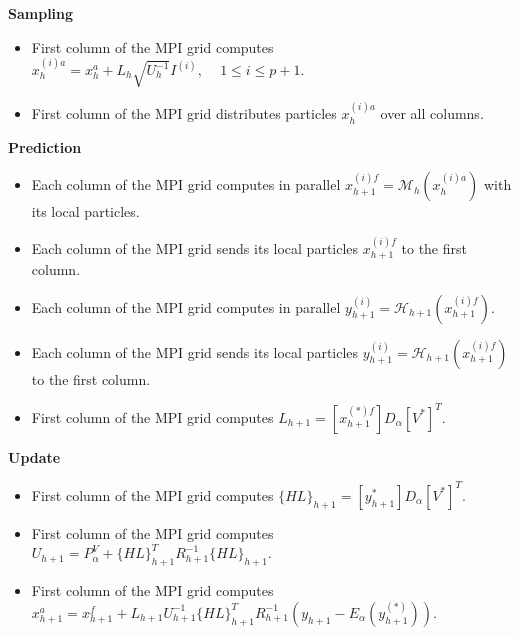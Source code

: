 \documentclass{tufte-book}
\begin{document}
 \par  \textbf{Sampling}


 \begin{itemize}

  \item First column  of the MPI grid computes  $ x_{h}^{(i)a} = x_h^a + L_h\sqrt{U_h^{-1}}I^{(i)} \textrm{, } \quad 1\leq i \leq p+1 $.

  \item First column  of the MPI grid distributes particles  $ x_{h}^{(i)a} $ over all columns.\\

 \end{itemize}

  \par  \textbf{Prediction}

   \begin{itemize}

  \item Each column  of the MPI grid computes in parallel  $ x_{h+1}^{(i)f} = \mathcal{M}_{h}(x_{h}^{(i)a})$ with its local particles.

  \item Each column of the MPI grid sends its local particles  $ x_{h+1}^{(i)f}$ to the first column.

   \item Each column of the MPI grid  computes in parallel  $ y_{h+1}^{(i)} = \mathcal{H}_{h+1}(x_{h+1}^{(i)f})$.

    \item Each column of the MPI grid sends its local particles   $ y_{h+1}^{(i)} = \mathcal{H}_{h+1}(x_{h+1}^{(i)f})$ to the first column.

  \item First column  of the MPI grid computes  $ L_{h+1} = [x_{h+1}^{(*)f}]D_\alpha [V^*]^T $.


 \end{itemize}

 \par  \textbf{Update}\\

 \begin{itemize}

 \item First column  of the MPI grid computes $ \{HL\}_{h+1} = [y_{h+1}^{*}]D_\alpha [V^*]^T$.

 \item  First column  of the MPI grid computes  $ U_{h+1} = P_{\alpha}^V +  \{HL\}_{h+1}^T R_{h+1}^{-1} \{HL\}_{h+1}$.

  \item First column  of the MPI grid computes $ x_{h+1}^a = x_{h+1}^f + L_{h+1}U_{h+1}^{-1}\{HL\}_{h+1}^T R_{h+1}^{-1} (y_{h+1}-E_\alpha(y_{h+1}^{(*)}))$.\\

 \end{itemize}
\end{document}
